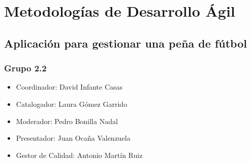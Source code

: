 \documentclass[
  a4paper, 9pt,
,tablecaptionabove
]{scrartcl}
\date{}
\title{}
\author{}
\providecommand{\tightlist}{%
  \setlength{\itemsep}{0pt}\setlength{\parskip}{0pt}}
\begin{document}




\hypertarget{metodologuxedas-de-desarrollo-uxe1gil}{%
\section{Metodologías de Desarrollo
Ágil}\label{metodologuxedas-de-desarrollo-uxe1gil}}

\hypertarget{aplicaciuxf3n-para-gestionar-una-peuxf1a-de-fuxfatbol}{%
\subsection{Aplicación para gestionar una peña de
fútbol}\label{aplicaciuxf3n-para-gestionar-una-peuxf1a-de-fuxfatbol}}

\hypertarget{grupo-2.2}{%
\subsubsection{Grupo 2.2}\label{grupo-2.2}}

\begin{itemize}
\tightlist
\item
  Coordinador: David Infante Casas
\item
  Catalogador: Laura Gómez Garrido
\item
  Moderador: Pedro Bonilla Nadal
\item
  Presentador: Juan Ocaña Valenzuela
\item
  Gestor de Calidad: Antonio Martín Ruiz
\end{itemize}
\end{document}

